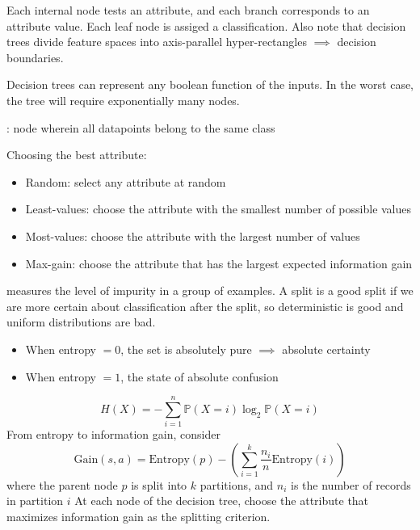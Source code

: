 \documentclass[12pt]{scrartcl}
\newcommand{\PP}{\mathbb{P}}
\begin{document}
\begin{note}
  Each internal node tests an attribute, and each branch corresponds to an attribute value. 
  Each leaf node is assiged a classification. Also note that decision trees divide feature spaces 
  into axis-parallel hyper-rectangles $\implies$ decision boundaries.
\end{note}

\begin{note}
  Decision trees can represent any boolean function of the inputs. 
  In the worst case, the tree will require exponentially many nodes.
\end{note}

\begin{definition}
  : node wherein all datapoints belong to the same class
\end{definition}

\begin{note}
  Choosing the best attribute:

  \begin{itemize}
    \item Random: select any attribute at random
    \item Least-values: choose the attribute with the smallest number of possible values
    \item Most-values: choose the attribute with the largest number of values
    \item Max-gain: choose the attribute that has the largest expected information gain
  \end{itemize}
\end{note}

\begin{definition}
   measures the level of impurity in a group of examples.
  A split is a good split if we are more certain about classification after the split, so deterministic is 
  good and uniform distributions are bad.
  \begin{itemize}
    \item When entropy $ = 0$, the set is absolutely pure $\implies$ absolute certainty
    \item When entropy $ = 1$, the state of absolute confusion
  \end{itemize}
  \[H(X) = -\sum_{i=1}^n \PP(X = i) \log_2 \PP(X = i)\]
  From entropy to information gain, consider 
  \[\text{Gain}(s, a) = \text{Entropy}(p) - (\sum_{i=1}^k \frac{n_i}{n}\text{Entropy}(i))\]
  where the parent node $p$ is split into $k$ partitions, and $n_i$ is the number of records in partition $i$
  At each node of the decision tree, choose the attribute that maximizes information gain as the splitting criterion. 
\end{definition}
\end{document}
